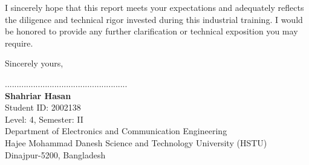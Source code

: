 I sincerely hope that this report meets your expectations and adequately reflects the diligence and technical rigor invested during this industrial training. I would be honored to provide any further clarification or technical exposition you may require.

\vspace{1.2cm}
\noindent
Sincerely yours,

\vspace{1.0cm}
\noindent
.................................................... \\
\textbf{Shahriar Hasan} \\
Student ID: 2002138 \\
Level: 4, Semester: II \\
Department of Electronics and Communication Engineering \\
Hajee Mohammad Danesh Science and Technology University (HSTU) \\
Dinajpur-5200, Bangladesh
